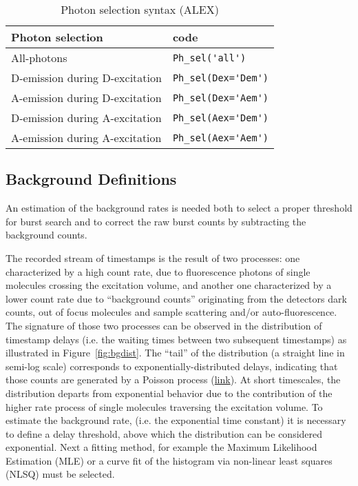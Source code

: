 \begin{table}
\begin{tabular}{l|l}
  Photon selection  & code \\
  \hline
  All-photons & \verb|Ph_sel('all')|\\
  D-emission during D-excitation & \verb|Ph_sel(Dex='Dem')|\\
  A-emission during D-excitation & \verb|Ph_sel(Dex='Aem')|\\
  D-emission during A-excitation & \verb|Ph_sel(Aex='Dem')|\\
  A-emission during A-excitation & \verb|Ph_sel(Aex='Aem')|\\
\end{tabular}
\caption{\label{tab:ph_sel_alex}Photon selection syntax (ALEX)}
\end{table}

\subsection{Background Definitions}
\label{sec:bg_intro}

An estimation of the background rates is needed both to select a proper threshold for
burst search and to correct the raw burst counts by subtracting the background counts.

The recorded stream of timestamps is the result of two processes: one characterized
by a high count rate, due to fluorescence photons of single molecules crossing the
excitation volume, and another one characterized by a lower count rate due to “background
counts” originating from the detectors dark counts, out of focus molecules
and sample scattering and/or auto-fluorescence\cite{Gopich_2008}.
The signature of those two processes can be
observed in the distribution of timestamp delays (i.e. the waiting times
between two subsequent timestamps) as illustrated in Figure~\ref{fig:bgdist}.
The “tail” of the distribution (a straight line in semi-log scale) corresponds
to exponentially-distributed delays, indicating that those counts are generated by a
Poisson process (\href{http://en.wikipedia.org/wiki/Poisson_process}{link}). At short
timescales, the distribution departs from exponential behavior due to the contribution
of the higher rate process of single molecules traversing the excitation volume.
To estimate the background rate, (i.e. the exponential time constant)
it is necessary to define a delay threshold, above which the distribution
can be considered exponential.
Next a fitting method, for example the Maximum
Likelihood Estimation (MLE) or a curve fit of the histogram via non-linear
least squares (NLSQ) must be selected.

